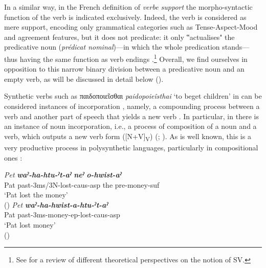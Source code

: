 \documentclass[output=paper,colorlinks,citecolor=brown]{langscibook}
\begin{document}
In a similar way, in the French definition of \textit{verbe support} the morpho-syntactic function of the verb is indicated exclusively. Indeed, the verb is considered as mere support, encoding only grammatical categories such as Tense-Aspect-Mood and agreement features, but it does not predicate: it only ‟actualises" the predicative noun (\textit{prédicat nominal})---in which the whole predication stands---thus having the same function as verb endings \citep[167]{Grossintro2004}.\footnote{See \citet[1--6]{Pompei2023} for a review of different theoretical perspectives on the notion of SV.} Overall, we find ourselves in opposition to this narrow binary division between a predicative noun and an empty verb, as will be discussed in detail below ().

Synthetic verbs such as παιδοποιεῖσθαι \textit{paidopoieîsthai} `to beget children' in  can be considered instances of incorporation \citep{Pompei2006,Pompei2012}, namely, a compounding process between a verb and another part of speech that yields a new verb \citep{Baker1988}. In particular, in  there is an instance of noun incorporation, i.e., a process of composition of a noun and a verb, which outputs a new verb form ([N+V]\textsubscript{V}) (\citealt[257, \textit{passim}]{Sapir1911}; \citealt{Mithun1984,Mithun1986,Mithun1997}). As is well known, this is a very productive process in polysynthetic languages, particularly in compositional ones \citep{Mattissen2023}: 
\largerpage[2]

\begin{exe}\label{ex:3}
	\ex 
        \settowidth {} 
	\begin{xlist}
		\ex \label{ex:3a}\gll \textit{Pet}	\textit{\textbf{waˀ-ha-htu-ˀt-aˀ}}	\textit{\textbf{neˀ}}	\textit{\textbf{o-hwist-aˀ}}\\
				Pat	past-3ms/3N-lost-caus-asp	the	pre-money-suf\\ 
			\glt `Pat lost the money' \\
   \hspace*{\fill}(\citealt[76--77]{Baker1988})
		\ex \label{ex:3b}\gll \textit{Pet}	\textit{\textbf{waˀ-ha-hwist-a-htu-ˀt-aˀ}}\\
				Pat	past-3ms-money-ep-lost-caus-asp\\ 
			\glt `Pat lost money' \\
   \hspace*{\fill}(\citealt[76--77]{Baker1988})
	\end{xlist}
\end{exe}
\end{document}
